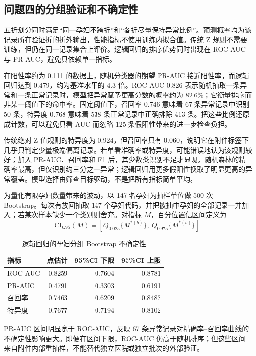 \documentclass[UTF8,a4paper,12pt]{ctexart}
\begin{document}
\subsection{问题四的分组验证和不确定性}

五折划分同时满足“同一孕妇不跨折”和“各折尽量保持异常比例”。预测概率均为该记录所在验证折的折外输出，性能指标不使用训练内拟合值。传统 Z 规则不需要训练，但仍在同一记录集合上评价。逻辑回归的排序优势同时出现在 ROC-AUC 与 PR-AUC，避免只依赖单一指标。

在阳性率约为 0.111 的数据上，随机分类器的期望 PR-AUC 接近阳性率，而逻辑回归达到 0.479，约为基准水平的 4.3 倍。ROC-AUC 0.826 表示随机抽取一条异常和一条正常记录时，模型把异常赋予更高分数的概率约为 82.6\%；它衡量排序而非某一阈值下的命中率。固定阈值下，召回率 0.746 意味着 67 条异常记录中识别 50 条，特异度 0.768 意味着 538 条正常记录中正确排除 413 条。把这些比例还原成计数，可以避免只看 AUC 而忽略 125 条假阳性带来的进一步检查负担。

传统绝对 Z 值规则的特异度为 0.924，但召回率只有 0.060，说明它在附件标签下几乎只判定少量极端偏离记录。若单看准确率或特异度，可能错误地认为该规则较好；加入 PR-AUC、召回率和 F1 后，其少数类识别不足才显现。随机森林的精确率最高，但仅识别约三分之一异常；逻辑回归用更多假阳性换取了明显更高的异常覆盖。模型选择由筛查目标驱动，不是把所有指标简单平均。

为量化有限孕妇数量带来的波动，以 147 名孕妇为抽样单位做 500 次 Bootstrap。每次有放回抽取 147 个孕妇代码，并把被抽中孕妇的全部记录一并加入；若某次样本缺少一个类别则舍弃。对指标 $M$，百分位置信区间定义为
\begin{equation}
\mathrm{CI}_{0.95}(M)=\left[Q_{0.025}\{M^{*(b)}\},\ Q_{0.975}\{M^{*(b)}\}\right].
\label{eq:bootstrap}
\end{equation}

\begin{table}[H]
\centering
\caption{逻辑回归的孕妇分组 Bootstrap 不确定性}
\small
\begin{tabular}{lrrr}
\toprule
指标 & 点估计 & 95\%CI 下限 & 95\%CI 上限 \\
\midrule
ROC-AUC & 0.8259 & 0.7604 & 0.8781 \\
PR-AUC & 0.4791 & 0.3303 & 0.6191 \\
召回率 & 0.7463 & 0.6209 & 0.8483 \\
特异度 & 0.7677 & 0.7194 & 0.8102 \\
\bottomrule
\end{tabular}
\end{table}

PR-AUC 区间明显宽于 ROC-AUC，反映 67 条异常记录对精确率--召回率曲线的不确定性影响更大。即便在区间下限，ROC-AUC 仍高于随机排序；但这些区间来自附件内部重抽样，不能替代独立医院或独立批次的外部验证。
\end{document}
